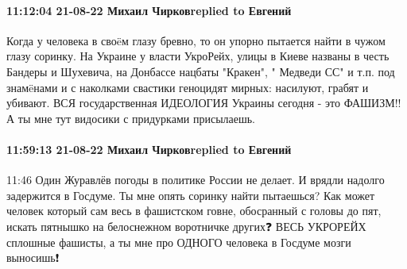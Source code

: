 \paragraph{11:12:04 21-08-22 Михаил Чирковreplied to Евгений}

Когда у человека в своëм глазу бревно, то он упорно пытается найти в чужом глазу соринку.
На Украине у власти УкроРейх, улицы в Киеве названы в честь Бандеры и Шухевича, на Донбассе нацбаты "Кракен", " Медведи СС" и т.п. под знамëнами и с наколками свастики геноцидят мирных: насилуют, грабят и убивают.
ВСЯ государственная ИДЕОЛОГИЯ Украины сегодня - это ФАШИЗМ!!
А ты мне тут видосики с придурками присылаешь.

\paragraph{11:59:13 21-08-22 Михаил Чирковreplied to Евгений}

11:46
Один Журавлёв погоды в политике России не делает. И врядли надолго задержится в Госдуме.
Ты мне опять соринку найти пытаешься?
Как может человек который сам весь в фашистском говне, обосранный с головы до пят, искать пятнышко на белоснежном воротничке других❓
ВЕСЬ УКРОРЕЙХ сплошные фашисты, а ты мне про ОДНОГО человека в Госдуме мозги выносишь❗

